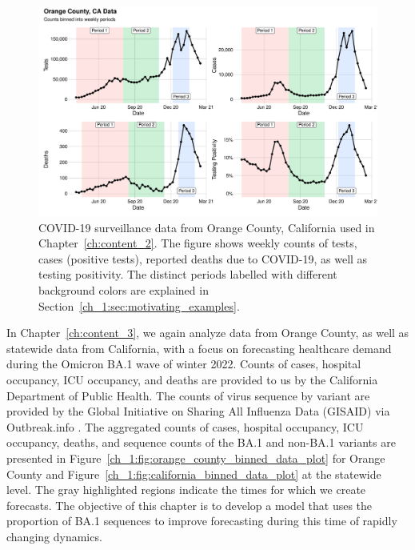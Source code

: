 \begin{figure}
    \centering
    \includegraphics[width=1.0\columnwidth]{binned_data_plot}
    \caption[COVID-19 surveillance data from Orange County, California used in Chapter~\ref{ch:content_2}.]{
    COVID-19 surveillance data from Orange County, California used in Chapter~\ref{ch:content_2}.
    The figure shows weekly counts of tests, cases (positive tests), reported deaths due to COVID-19, as well as testing positivity.
    The distinct periods labelled with different background colors are explained in Section~\ref{ch_1:sec:motivating_examples}.}
    \label{ch_1:fig:binned_data_plot}
\end{figure}

In Chapter~\ref{ch:content_3}, we again analyze data from Orange County, as well as statewide data from California, with a focus on forecasting healthcare demand during the Omicron BA.1 wave of winter 2022. 
Counts of cases, hospital occupancy, ICU occupancy, and deaths are provided to us by the California Department of Public Health.
The counts of virus sequence by variant are provided by the Global Initiative on Sharing All Influenza Data (GISAID) \citep{shu2017gisaid} via Outbreak.info \citep{Gangavarapu2023}.
The aggregated counts of cases, hospital occupancy, ICU occupancy, deaths, and sequence counts of the BA.1 and non-BA.1 variants are presented in Figure~\ref{ch_1:fig:orange_county_binned_data_plot} for Orange County and Figure~\ref{ch_1:fig:california_binned_data_plot} at the statewide level.
The gray highlighted regions indicate the times for which we create forecasts.
The objective of this chapter is to develop a model that uses the proportion of BA.1 sequences to improve forecasting during this time of rapidly changing dynamics.

